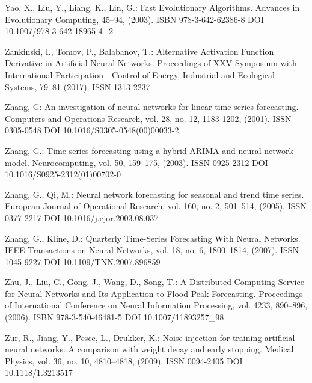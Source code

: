 \begin{thebibliography}{99.}
 Yao, X., Liu, Y., Liang, K., Lin, G.: Fast Evolutionary Algorithms. Advances in Evolutionary Computing, 45--94, (2003). ISBN 978-3-642-62386-8 DOI 10.1007/978-3-642-18965-4\_2

 Zankinski, I., Tomov, P., Balabanov, T.: Alternative Activation Function Derivative in Artificial Neural Networks. Proceedings of XXV Symposium with International Participation - Control of Energy, Industrial and Ecological Systems, 79--81 (2017). ISSN 1313-2237

 Zhang, G: An investigation of neural networks for linear time-series forecasting. Computers and Operations Research, vol. 28, no. 12, 1183-1202, (2001). ISSN 0305-0548 DOI 10.1016/S0305-0548(00)00033-2

 Zhang, G.: Time series forecasting using a hybrid ARIMA and neural network model. Neurocomputing, vol. 50, 159--175, (2003). ISSN 0925-2312 DOI 10.1016/S0925-2312(01)00702-0

 Zhang, G., Qi, M.: Neural network forecasting for seasonal and trend time series. European Journal of Operational Research, vol. 160, no. 2, 501--514, (2005). ISSN 0377-2217 DOI 10.1016/j.ejor.2003.08.037

 Zhang, G., Kline, D.: Quarterly Time-Series Forecasting With Neural Networks. IEEE Transactions on Neural Networks, vol. 18, no. 6, 1800--1814, (2007). ISSN 1045-9227 DOI 10.1109/TNN.2007.896859

 Zhu, J., Liu, C., Gong, J., Wang, D., Song, T.: A Distributed Computing Service for Neural Networks and Its Application to Flood Peak Forecasting. Proceedings of International Conference on Neural Information Processing, vol. 4233, 890--896, (2006). ISBN 978-3-540-46481-5 DOI 10.1007/11893257\_98

 Zur, R., Jiang, Y., Pesce, L., Drukker, K.: Noise injection for training artificial neural networks: A comparison with weight decay and early stopping. Medical Physics, vol. 36, no. 10, 4810--4818, (2009). ISSN 0094-2405 DOI 10.1118/1.3213517

\end{thebibliography}
